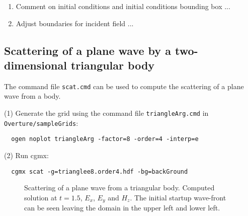 \begin{enumerate}
  \item Comment on initial conditions and initial conditions bounding box ...
  \item Adjust boundaries for incident field ...
\end{enumerate}



\clearpage
\subsection{Scattering of a plane wave by a two-dimensional triangular body} \label{sec:scatTri}

The command file {\tt scat.cmd} can be used to compute the scattering
of a plane wave from a body.

\noindent (1) Generate the grid using the command file {\tt triangleArg.cmd} in {\tt Overture/sampleGrids}:
{\small
\begin{verbatim}
  ogen noplot triangleArg -factor=8 -order=4 -interp=e
\end{verbatim}
}
\noindent (2) Run cgmx: 
\begin{verbatim}
  cgmx scat -g=trianglee8.order4.hdf -bg=backGround
\end{verbatim}

{
\begin{figure}[hbt]
\newcommand{\figWidth}{5.5cm}
\newcommand{\trimfig}[2]{\trimFig{#1}{#2}{0.1}{0.05}{.05}{.05}}
\begin{center}
\end{center}
\caption{Scattering of a plane wave from a triangular body. Computed solution at $t=1.5$, $E_x$, $E_y$ and $H_z$. The initial startup wave-front can
     be seen leaving the domain in the upper left and lower left.}
\label{fig:scatTri2d}
\end{figure}
}

